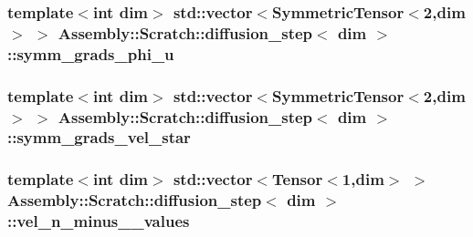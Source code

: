 \subsubsection[{symm\+\_\+grads\+\_\+phi\+\_\+u}]{\setlength{\rightskip}{0pt plus 5cm}template$<$int dim$>$ std\+::vector$<$Symmetric\+Tensor$<$2,dim$>$ $>$ {\bf Assembly\+::\+Scratch\+::diffusion\+\_\+step}$<$ dim $>$\+::symm\+\_\+grads\+\_\+phi\+\_\+u}\label{struct_assembly_1_1_scratch_1_1diffusion__step_a5f7d1700139f21792a1107ede3903cf5}
\hypertarget{struct_assembly_1_1_scratch_1_1diffusion__step_a368904230be585863ee201beabbc8fb6}{}
\subsubsection[{symm\+\_\+grads\+\_\+vel\+\_\+star}]{\setlength{\rightskip}{0pt plus 5cm}template$<$int dim$>$ std\+::vector$<$Symmetric\+Tensor$<$2,dim$>$ $>$ {\bf Assembly\+::\+Scratch\+::diffusion\+\_\+step}$<$ dim $>$\+::symm\+\_\+grads\+\_\+vel\+\_\+star}\label{struct_assembly_1_1_scratch_1_1diffusion__step_a368904230be585863ee201beabbc8fb6}
\hypertarget{struct_assembly_1_1_scratch_1_1diffusion__step_a9fdda6a8d4c418b53bd1e9c6e03ffc26}{}
\subsubsection[{vel\+\_\+n\+\_\+minus\+\_\+1\+\_\+values}]{\setlength{\rightskip}{0pt plus 5cm}template$<$int dim$>$ std\+::vector$<$Tensor$<$1,dim$>$ $>$ {\bf Assembly\+::\+Scratch\+::diffusion\+\_\+step}$<$ dim $>$\+::vel\+\_\+n\+\_\+minus\+\_\+\_\+values}\label{struct_assembly_1_1_scratch_1_1diffusion__step_a9fdda6a8d4c418b53bd1e9c6e03ffc26}
\hypertarget{struct_assembly_1_1_scratch_1_1diffusion__step_a3c69fd1c796447267c5e60b4574b7cd6}{}
